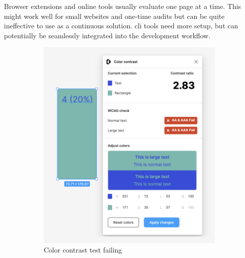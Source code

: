 \documentclass{master_thesis}
\begin{document}
Browser extensions and online tools usually evaluate one page at a time. This might work well for small websites and one-time audits but can be quite ineffective to use as a continuous solution. \Ac{cli} tools need more setup, but can potentially be seamlessly integrated into the development workflow.

\begin{figure}[ht]
	\centering
	\begin{subfigure}{0.4\textwidth}
		\includegraphics[width=\textwidth]{img/figma plugin-color-contrast-fail.png}
		\caption{Color contrast test failing}
	\end{subfigure}
	\hspace{0.05\textwidth}
	\begin{subfigure}{0.4\textwidth}

\end{subfigure}
\end{figure}
\end{document}
